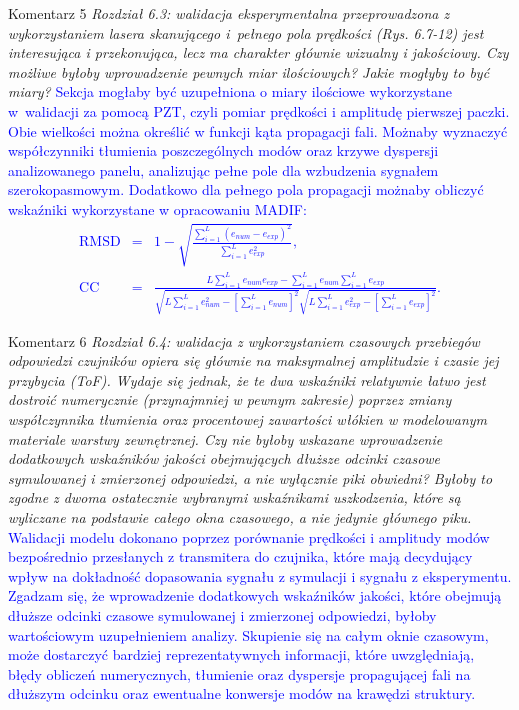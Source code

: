 \documentclass[10pt,aspectratio=169]{beamer} %
\begin{document}
\begin{frame}[label=frame10]{Komentarz 5}\justifying
\textit{Rozdział 6.3: walidacja eksperymentalna przeprowadzona z wykorzystaniem lasera
skanującego i~pełnego pola prędkości (Rys. 6.7-12) jest interesująca i przekonująca, lecz ma charakter głównie wizualny i jakościowy. Czy możliwe byłoby wprowadzenie pewnych miar ilościowych? Jakie mogłyby to być miary?}
\textcolor{blue}{Sekcja mogłaby być uzupełniona o miary ilościowe wykorzystane w~walidacji za pomocą PZT, czyli pomiar prędkości i amplitudę pierwszej paczki. Obie wielkości można określić w funkcji kąta propagacji fali. Możnaby wyznaczyć współczynniki tłumienia poszczególnych modów oraz krzywe dyspersji analizowanego panelu, analizując pełne pole dla wzbudzenia sygnałem szerokopasmowym.
Dodatkowo dla pełnego pola propagacji możnaby obliczyć wskaźniki wykorzystane w opracowaniu MADIF:
\begin{eqnarray}
	\mathrm{RMSD} & = & 1 - \sqrt{\frac{\sum_{i=1}^{L}\left(e_{num}-e_{exp}\right)^2}	{\sum_{i=1}^{L}e_{exp}^2}},\nonumber\\
	\mathrm{CC} & = & \frac{L\sum_{i=1}^{L}e_{num}e_{exp}-\sum_{i=1}^{L}e_{num}\sum_{i=1}^{L}e_{exp}}{\sqrt{L\sum_{i=1}^{L}e_{num}^2-\left[\sum_{i=1}^{L}e_{num}\right]^2}\sqrt{L\sum_{i=1}^{L}e_{exp}^2-\left[\sum_{i=1}^{L}e_{exp}\right]^2}}.\nonumber
\end{eqnarray}
}
\end{frame}

\begin{frame}[label=frame11]{Komentarz 6}\justifying
\textit{Rozdział 6.4: walidacja z wykorzystaniem czasowych przebiegów odpowiedzi czujników 	opiera się głównie na maksymalnej amplitudzie i czasie jej przybycia (ToF). Wydaje się jednak, że te dwa wskaźniki relatywnie łatwo jest dostroić numerycznie (przynajmniej w pewnym zakresie) poprzez zmiany współczynnika tłumienia oraz procentowej zawartości włókien w modelowanym materiale warstwy zewnętrznej. Czy nie byłoby wskazane wprowadzenie dodatkowych wskaźników jakości obejmujących dłuższe odcinki czasowe symulowanej i zmierzonej odpowiedzi, a nie wyłącznie piki obwiedni? Byłoby to zgodne z dwoma ostatecznie wybranymi wskaźnikami uszkodzenia, które są wyliczane na podstawie całego okna czasowego, a nie jedynie głównego piku.}\\
\textcolor{blue}{Walidacji modelu dokonano poprzez porównanie prędkości i amplitudy modów bezpośrednio przesłanych z transmitera do czujnika, które mają decydujący wpływ na dokładność dopasowania sygnału z symulacji i sygnału z eksperymentu. Zgadzam się, że wprowadzenie dodatkowych wskaźników jakości, które obejmują dłuższe odcinki czasowe symulowanej i zmierzonej odpowiedzi, byłoby wartościowym uzupełnieniem analizy. Skupienie się na całym oknie czasowym, może dostarczyć bardziej reprezentatywnych informacji, które uwzględniają, błędy obliczeń numerycznych, tłumienie oraz dyspersje propagującej fali na dłuższym odcinku oraz ewentualne konwersje modów na krawędzi struktury.}
\end{frame}
\end{document}
